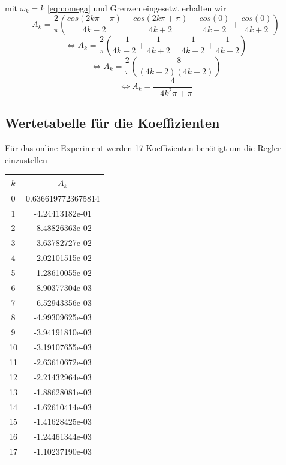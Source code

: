 mit $\omega_k=k$
\eqref{eqn:omega}
und Grenzen eingesetzt erhalten wir
\begin{equation}
A_k=\frac{2}{\pi}\left ( \frac{cos(2k\pi-\pi)}{4k-2} - \frac{cos(2k\pi+\pi)}{4k+2} - \frac{cos(0)}{4k-2} + \frac{cos(0)}{4k+2} \right )
\end{equation}
\begin{equation}
\Leftrightarrow A_k=\frac{2}{\pi}\left ( \frac{-1}{4k-2} + \frac{1}{4k+2} - \frac{1}{4k-2} + \frac{1}{4k+2} \right )
\end{equation}
\begin{equation}
\Leftrightarrow A_k= \frac{2}{\pi} \left ( \frac{-8}{(4k-2)(4k+2)} \right )
\end{equation}
\begin{equation}
\Leftrightarrow A_k= \frac{4}{-4k^2 \pi + \pi}
\end{equation}
\subsection{Wertetabelle für die Koeffizienten}
Für das online-Experiment werden 17 Koeffizienten benötigt um die
Regler einzustellen 
\begin{table}
  \centering
  \label{tab:koeffizienten}
  \begin{tabular}{c c}
    \toprule
    $k$ & $A_k$\\
    \midrule
      0 & 0.6366197723675814\\
      1 & -4.24413182e-01\\ 
      2 & -8.48826363e-02\\ 
      3 & -3.63782727e-02\\
      4 & -2.02101515e-02\\
      5 & -1.28610055e-02\\ 
      6 & -8.90377304e-03\\
      7 & -6.52943356e-03\\
      8 & -4.99309625e-03\\
      9 & -3.94191810e-03\\
      10 & -3.19107655e-03\\
      11 & -2.63610672e-03\\
      12 & -2.21432964e-03\\
      13 & -1.88628081e-03\\
      14 & -1.62610414e-03\\
      15 & -1.41628425e-03\\
      16 & -1.24461344e-03\\
      17 & -1.10237190e-03\\
    \bottomrule
  \end{tabular}
\end{table}
\newpage
